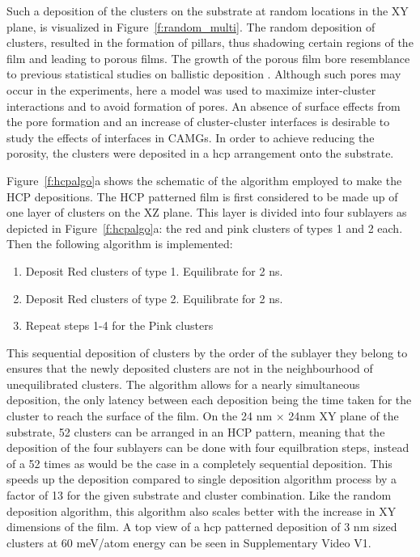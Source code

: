 \begin{changebar}
Such a deposition of the clusters on the substrate at random locations in the XY plane, is visualized in Figure~\ref{f:random_multi}. The random deposition of clusters, resulted in the formation of pillars, thus shadowing certain regions of the film and leading to porous films. The growth of the porous film bore resemblance to previous statistical studies on ballistic deposition \cite{Meakin1986}. Although such pores may occur in the experiments, here a model was used to maximize inter-cluster interactions and to avoid formation of pores. An absence of surface effects from the pore formation and an increase of cluster-cluster interfaces is desirable to study the effects of interfaces in CAMGs. In order to achieve reducing the porosity, the clusters were deposited in a \gls{hcp} arrangement onto the substrate. \par
\end{changebar}

Figure~\ref{f:hcpalgo}a shows the schematic of the algorithm employed to make the HCP depositions. The HCP patterned film is first considered to be made up of one layer of clusters on the XZ plane. This layer is divided into four sublayers as depicted in Figure~\ref{f:hcpalgo}a: the red and pink clusters of types 1 and 2 each. Then the following algorithm is implemented:

\begin{enumerate}[noitemsep]
	\item Deposit Red clusters of type 1. Equilibrate for 2 ns.
	\item Deposit Red clusters of type 2. Equilibrate for 2 ns.
	\item Repeat steps 1-4 for the Pink clusters
\end{enumerate}

This sequential deposition of clusters by the order of the sublayer they belong to ensures that the newly deposited clusters are not in the neighbourhood of unequilibrated clusters. The algorithm allows for a nearly simultaneous deposition, the only latency between each deposition being the time taken for the cluster to reach the surface of the film. On the 24 nm $\times$ 24nm XY plane of the substrate, 52 clusters can be arranged in an HCP pattern, meaning that the deposition of the four sublayers can be done with four equilbration steps, instead of a 52 times as would be the case in a completely sequential deposition. This speeds up the deposition compared to single deposition algorithm process by a factor of 13 for the given substrate and cluster combination. Like the random deposition algorithm, this algorithm also scales better with the increase in XY dimensions of the film. A top view of a \gls{hcp} patterned deposition of 3 nm sized clusters at 60 meV/atom energy can be seen in Supplementary Video V1.  \par


